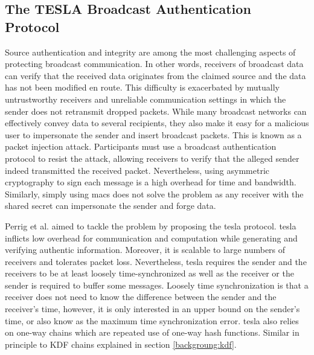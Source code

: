 \subsection{The TESLA Broadcast Authentication Protocol}\label{bg:tesla}
Source authentication and integrity are among the most challenging aspects of protecting broadcast communication. In other words, receivers of broadcast data can verify that the received data originates from the claimed source and the data has not been modified en route. This difficulty is exacerbated by mutually untrustworthy receivers and unreliable communication settings in which the sender does not retransmit dropped packets. While many broadcast networks can effectively convey data to several recipients, they also make it easy for a malicious user to impersonate the sender and insert broadcast packets. This is known as a packet injection attack. Participants must use a broadcast authentication protocol to resist the attack, allowing receivers to verify that the alleged sender indeed transmitted the received packet. Nevertheless, using asymmetric cryptography to sign each message is a high overhead for time and bandwidth. Similarly, simply using \glspl{mac} does not solve the problem as any receiver with the shared secret can impersonate the sender and forge data.
\par
Perrig et al. \cite{perrig2003tesla} aimed to tackle the problem by proposing the \gls{tesla} protocol. \gls{tesla} inflicts low overhead for communication and computation while generating and verifying authentic information. Moreover, it is scalable to large numbers of receivers and tolerates packet loss. Nevertheless, \gls{tesla} requires the sender and the receivers to be at least loosely time-synchronized as well as the receiver or the sender is required to buffer some messages. Loosely time synchronization is that a receiver does not need to know the difference between the sender and the receiver’s time, however, it is only interested in an upper bound on the sender's time, or also know as the maximum time synchronization error. \gls{tesla} also relies on one-way chains which are repeated use of one-way hash functions. Similar in principle to KDF chains explained in section \ref{backgroung:kdf}. 
\par
